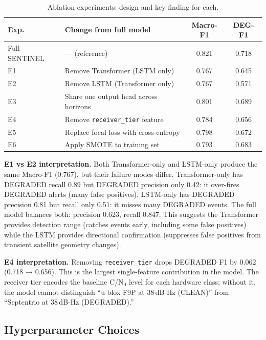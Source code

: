 \documentclass[12pt,a4paper]{article}
\newcommand{\code}[1]{\texttt{#1}}
\begin{document}
\begin{table}[H]
  \centering
  \caption{Ablation experiments: design and key finding for each.}
  \begin{tabular}{lp{5cm}cc}
    \toprule
    \textbf{Exp.} & \textbf{Change from full model} & \textbf{Macro-F1} & \textbf{DEG-F1} \\
    \midrule
    Full SENTINEL & --- (reference) & 0.821 & 0.718 \\
    E1 & Remove Transformer (LSTM only) & 0.767 & 0.645 \\
    E2 & Remove LSTM (Transformer only) & 0.767 & 0.571 \\
    E3 & Share one output head across horizons & 0.801 & 0.689 \\
    E4 & Remove \code{receiver\_tier} feature & 0.784 & 0.656 \\
    E5 & Replace focal loss with cross-entropy & 0.798 & 0.672 \\
    E6 & Apply SMOTE to training set & 0.793 & 0.683 \\
    \bottomrule
  \end{tabular}
\end{table}

\textbf{E1 vs E2 interpretation.}
Both Transformer-only and LSTM-only produce the same Macro-F1 (0.767), but their
failure modes differ.
Transformer-only has DEGRADED recall 0.89 but DEGRADED precision only 0.42:
it over-fires DEGRADED alerts (many false positives).
LSTM-only has DEGRADED precision 0.81 but recall only 0.51: it misses many DEGRADED
events.
The full model balances both: precision 0.623, recall 0.847.
This suggests the Transformer provides detection range (catches events early, including
some false positives) while the LSTM provides directional confirmation (suppresses
false positives from transient satellite geometry changes).

\textbf{E4 interpretation.}
Removing \code{receiver\_tier} drops DEGRADED F1 by 0.062 (0.718 → 0.656).
This is the largest single-feature contribution in the model.
The receiver tier encodes the baseline C/N$_0$ level for each hardware class;
without it, the model cannot distinguish ``u-blox F9P at 38\,dB-Hz (CLEAN)''
from ``Septentrio at 38\,dB-Hz (DEGRADED).''

\subsection{Hyperparameter Choices}
\end{document}
